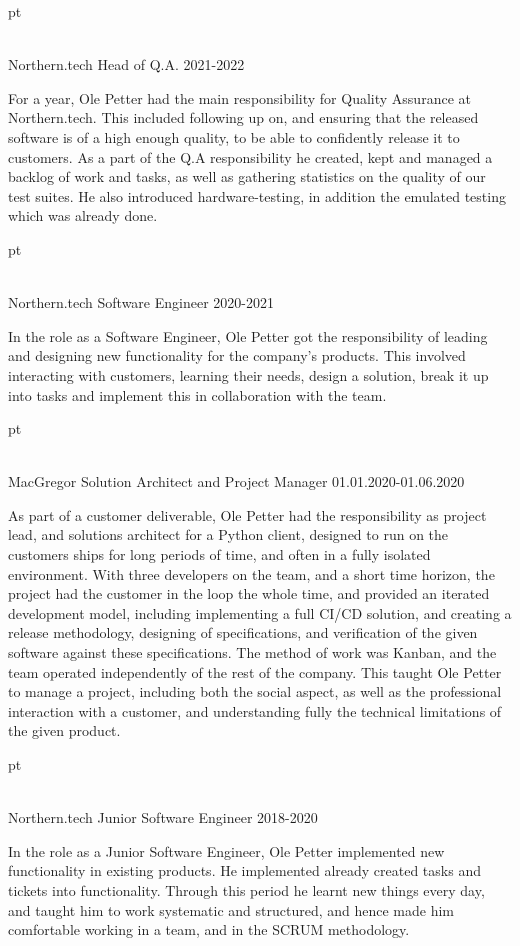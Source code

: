  pt

\\ \star Northern.tech Head of Q.A. 2021-2022

For a year, Ole Petter had the main responsibility for Quality Assurance at
Northern.tech. This included following up on, and ensuring that the released
software is of a high enough quality, to be able to confidently release it to
customers. As a part of the Q.A responsibility he created, kept and managed a
backlog of work and tasks, as well as gathering statistics on the quality of our
test suites. He also introduced hardware-testing, in addition the emulated
testing which was already done.

 pt

\\ \star Northern.tech Software Engineer 2020-2021

In the role as a Software Engineer, Ole Petter got the responsibility of leading
and designing new functionality for the company's products. This involved
interacting with customers, learning their needs, design a solution, break it up
into tasks and implement this in collaboration with the team.

 pt

\\ \star MacGregor Solution Architect and Project Manager 01.01.2020-01.06.2020

As part of a customer deliverable, Ole Petter had the responsibility as project
lead, and solutions architect for a Python client, designed to run on the
customers ships for long periods of time, and often in a fully isolated
environment. With three developers on the team, and a short time horizon, the
project had the customer in the loop the whole time, and provided an iterated
development model, including implementing a full CI/CD solution, and creating a
release methodology, designing of specifications, and verification of the given
software against these specifications. The method of work was Kanban, and the
team operated independently of the rest of the company. This taught Ole Petter
to manage a project, including both the social aspect, as well as the
professional interaction with a customer, and understanding fully the technical
limitations of the given product.

 pt

\\ \star Northern.tech Junior Software Engineer 2018-2020

In the role as a Junior Software Engineer, Ole Petter implemented new
functionality in existing products. He implemented already created tasks and
tickets into functionality. Through this period he learnt new things every day,
and taught him to work systematic and structured, and hence made him comfortable
working in a team, and in the SCRUM methodology.

